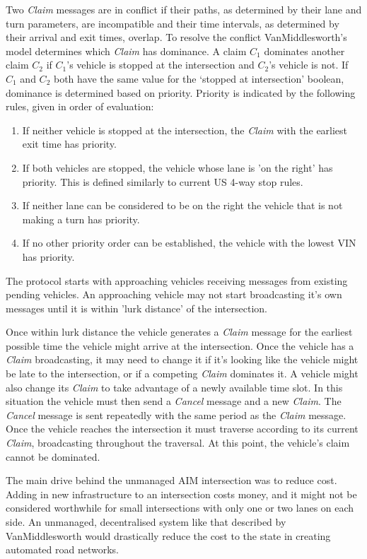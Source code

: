 Two \emph{Claim} messages are in conflict if their paths, as determined by their lane and turn parameters, are incompatible and their time intervals, as determined by their arrival and exit times, overlap. To resolve the conflict VanMiddlesworth's model determines which \emph{Claim} has dominance. A claim $C_1$ dominates another claim $C_2$ if $C_1$'s vehicle is stopped at the intersection and $C_2$'s vehicle is not. If $C_1$ and $C_2$ both have the same value for the `stopped at intersection' boolean, dominance is determined based on priority. Priority is indicated by the following rules, given in order of evaluation:
\begin{enumerate}
\item If neither vehicle is stopped at the intersection, the \emph{Claim} with the earliest exit time has priority.
\item If both vehicles are stopped, the vehicle whose lane is 'on the right' has priority. This is defined similarly to current US 4-way stop rules.
\item If neither lane can be considered to be on the right the vehicle that is not making a turn has priority.
\item If no other priority order can be established, the vehicle with the lowest VIN has priority.
\end{enumerate}

The protocol starts with approaching vehicles receiving messages from existing pending vehicles. An approaching vehicle may not start broadcasting it's own messages until it is within 'lurk distance' of the intersection. 

Once within lurk distance the vehicle generates a \emph{Claim} message for the earliest possible time the vehicle might arrive at the intersection. Once the vehicle has a \emph{Claim} broadcasting, it may need to change it if it's looking like the vehicle might be late to the intersection, or if a competing \emph{Claim} dominates it. A vehicle might also change its \emph{Claim} to take advantage of a newly available time slot. In this situation the vehicle must then send a \emph{Cancel} message and a new \emph{Claim}. The \emph{Cancel} message is sent repeatedly with the same period as the \emph{Claim} message. Once the vehicle reaches the intersection it must traverse according to its current \emph{Claim}, broadcasting throughout the traversal. At this point, the vehicle's claim cannot be dominated.

The main drive behind the unmanaged AIM intersection was to reduce cost. Adding in new infrastructure to an intersection costs money, and it might not be considered worthwhile for small intersections with only one or two lanes on each side. An unmanaged, decentralised system like that described by VanMiddlesworth would drastically reduce the cost to the state in creating automated road networks.

